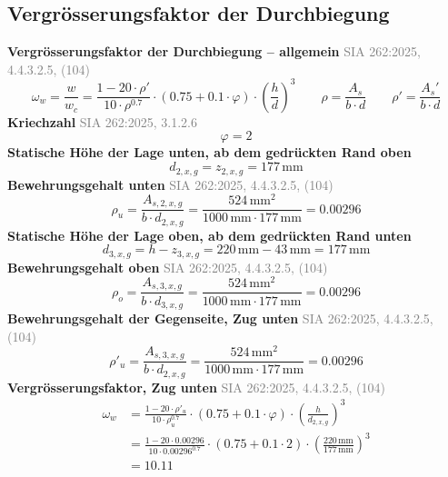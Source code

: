 \documentclass[11pt,a4paper]{article}
\newcommand{\normref}[1]{{\small\textcolor{gray}{#1}}}
\begin{document}
\subsection{Vergrösserungsfaktor der Durchbiegung}
\noindent\textbf{Vergrösserungsfaktor der Durchbiegung – allgemein} \hfill \normref{SIA 262:2025, 4.4.3.2.5, (104)}
\begin{equation*}
\omega_w = \frac{w}{w_c} = \frac{1 - 20 \cdot \rho'}{10 \cdot \rho^{0.7}} \cdot \left(0.75 + 0.1 \cdot \varphi\right) \cdot \left(\frac{h}{d}\right)^{3} \qquad \rho = \frac{A_s}{b \cdot d} \qquad \rho' = \frac{A_s'}{b \cdot d}
\end{equation*}
\noindent\textbf{Kriechzahl} \hfill \normref{SIA 262:2025, 3.1.2.6}
\begin{equation*}
\varphi = 2
\end{equation*}
\noindent\textbf{Statische Höhe der Lage unten, ab dem gedrückten Rand oben}
\begin{equation*}
d_{2,x,g} = z_{2,x,g} = 177\,\mathrm{mm}
\end{equation*}
\noindent\textbf{Bewehrungsgehalt unten} \hfill \normref{SIA 262:2025, 4.4.3.2.5, (104)}
\begin{equation*}
\rho_{u} = \frac{A_{s,2,x,g}}{b \cdot d_{2,x,g}} = \frac{524\,\mathrm{mm}^{2}}{1000\,\mathrm{mm} \cdot 177\,\mathrm{mm}} = 0.00296
\end{equation*}
\noindent\textbf{Statische Höhe der Lage oben, ab dem gedrückten Rand unten}
\begin{equation*}
d_{3,x,g} = h - z_{3,x,g} = 220\,\mathrm{mm} - 43\,\mathrm{mm} = 177\,\mathrm{mm}
\end{equation*}
\noindent\textbf{Bewehrungsgehalt oben} \hfill \normref{SIA 262:2025, 4.4.3.2.5, (104)}
\begin{equation*}
\rho_{o} = \frac{A_{s,3,x,g}}{b \cdot d_{3,x,g}} = \frac{524\,\mathrm{mm}^{2}}{1000\,\mathrm{mm} \cdot 177\,\mathrm{mm}} = 0.00296
\end{equation*}
\noindent\textbf{Bewehrungsgehalt der Gegenseite, Zug unten} \hfill \normref{SIA 262:2025, 4.4.3.2.5, (104)}
\begin{equation*}
\rho'_{u} = \frac{A_{s,3,x,g}}{b \cdot d_{2,x,g}} = \frac{524\,\mathrm{mm}^{2}}{1000\,\mathrm{mm} \cdot 177\,\mathrm{mm}} = 0.00296
\end{equation*}
\noindent\textbf{Vergrösserungsfaktor, Zug unten} \hfill \normref{SIA 262:2025, 4.4.3.2.5, (104)}
\begin{equation*}
\begin{aligned}
  \omega_w &= \frac{1 - 20 \cdot \rho'_{u}}{10 \cdot \rho_{u}^{0.7}} \cdot \left(0.75 + 0.1 \cdot \varphi\right) \cdot \left(\frac{h}{d_{2,x,g}}\right)^{3} \\
  &= \frac{1 - 20 \cdot 0.00296}{10 \cdot 0.00296^{0.7}} \cdot \left(0.75 + 0.1 \cdot 2\right) \cdot \left(\frac{220\,\mathrm{mm}}{177\,\mathrm{mm}}\right)^{3} \\
  &= 10.11
\end{aligned}
\end{equation*}
\end{document}
